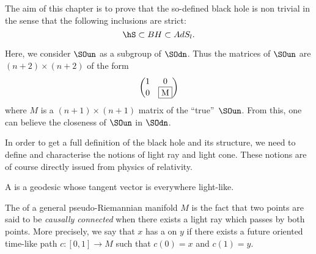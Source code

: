 The aim of this chapter is to prove that the so-defined black hole is non trivial in the sense that the following inclusions are strict:
\begin{equation}		\label{EqhSssubBH}
 \hS\subset BH\subset AdS_l.
 \end{equation}



\begin{remark}
Here, we consider $\SOun$ as a subgroup of $\SOdn$. Thus the matrices of $\SOun$ are $(n+2)\times (n+2)$ of the form
\[
\begin{pmatrix}
   1 & 0\\
   0 & \fbox{M}
\end{pmatrix}
\]
where $M$ is a $(n+1)\times (n+1)$ matrix of the ``true''\ $\SOun$. From this, one can believe the closeness of $\SOun$ in $\SOdn$.
\end{remark}


In order to get a full definition of the black hole and its structure, we need to define and characterise the notions of light ray and light cone. These notions are of course directly issued from physics of relativity.  
\begin{definition}
A  is a geodesic whose tangent vector is everywhere light-like.
\label{lightraycone}
 \end{definition}

The  of a general pseudo-Riemannian manifold $M$ is the fact that two points are said to be \emph{causally connected} when there exists a light ray which passes by both points. More precisely, we say that $x$ has a  on $y$ if there exists a future oriented time-like path $c\colon [0,1]\to M$ such that $c(0)=x$ and $c(1)=y$.

